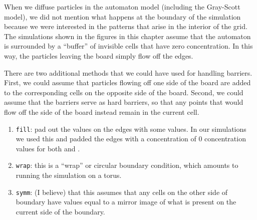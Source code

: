 \begin{exercise}[%
Try changing the diffusion rates in the Gray-Scott model from the values of $\textvar{dA} = 0.2$ and $\textvar{dB} = 0.1$ presented in this chapter to see if the same behavior is obtained. What happens if we multiply both diffusion rates by a constant factor? What happens if we make the diffusion rates equal?
]\end{exercise}

When we diffuse particles in the automaton model (including the Gray-Scott model), we did not mention what happens at the boundary of the simulation because we were interested in the patterns that arise in the interior of the grid. The simulations shown in the figures in this chapter assume that the automaton is surrounded by a ``buffer'' of invisible cells that have zero concentration. In this way, the particles leaving the board simply flow off the edges.

There are two additional methods that we could have used for handling barriers. First, we could assume that particles flowing off one side of the board are added to the corresponding cells on the opposite side of the board. Second, we could assume that the barriers serve as hard barriers, so that any points that would flow off the side of the board instead remain in the current cell.

\begin{exercise}\end{exercise}

\begin{enumerate}
\item \texttt{fill}: pad out the values on the edges with some values. In our simulations we used this and padded the edges with a concentration of 0 concentration values for both  and .
\item \texttt{wrap}: this is a ``wrap'' or circular boundary condition, which amounts to running the simulation on a torus.
\item \texttt{symm}: (I believe) that this assumes that any cells on the other side of boundary have values equal to a mirror image of what is present on the current side of the boundary.
\end{enumerate}

\begin{exercise}[%
Deciding what happens at boundaries is an important part of modeling and simulations. In our Gray-Scott Reaction-Diffusion code, we have given the \texttt{signal.convolve2d()} the \texttt{boundary='fill'} parameter. There are additional options \texttt{'wrap'} and \texttt{'symm'}, which can be combined with the \texttt{'fillvalue'} option as documented here (\url{https://docs.scipy.org/doc/scipy/reference/generated/scipy.signal.convolve2d.html}).
]\end{exercise}
